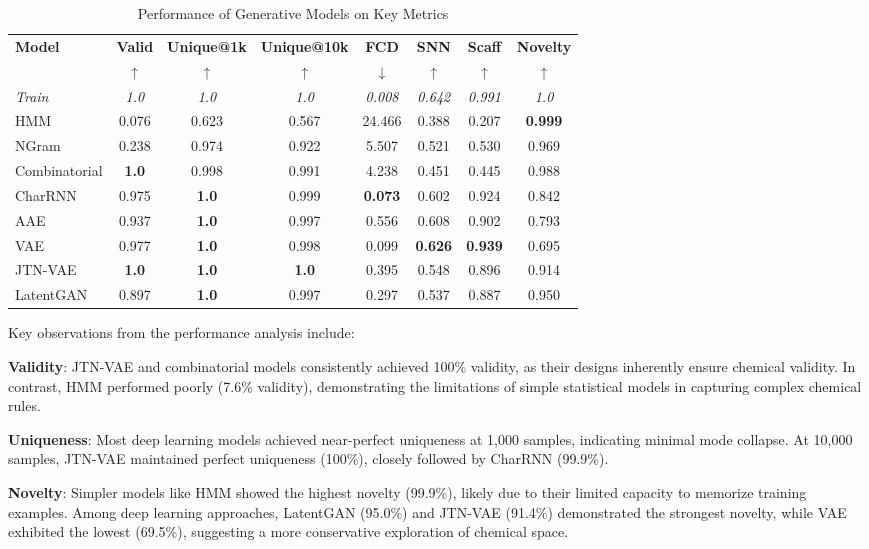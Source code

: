 \documentclass[conference]{IEEEtran}
\begin{document}
\begin{table}[htbp]
\caption{Performance of Generative Models on Key Metrics}
\label{tab:model_performance}
\centering
\small
\begin{tabular}{@{}lccccccc@{}}
\toprule
\textbf{Model} & \textbf{Valid} & \textbf{Unique@1k} & \textbf{Unique@10k} & \textbf{FCD} & \textbf{SNN} & \textbf{Scaff} & \textbf{Novelty} \\
 & ↑ & ↑ & ↑ & ↓ & ↑ & ↑ & ↑ \\
\midrule
\textit{Train} & \textit{1.0} & \textit{1.0} & \textit{1.0} & \textit{0.008} & \textit{0.642} & \textit{0.991} & \textit{1.0} \\
HMM & 0.076 & 0.623 & 0.567 & 24.466 & 0.388 & 0.207 & \textbf{0.999} \\
NGram & 0.238 & 0.974 & 0.922 & 5.507 & 0.521 & 0.530 & 0.969 \\
Combinatorial & \textbf{1.0} & 0.998 & 0.991 & 4.238 & 0.451 & 0.445 & 0.988 \\
CharRNN & 0.975 & \textbf{1.0} & 0.999 & \textbf{0.073} & 0.602 & 0.924 & 0.842 \\
AAE & 0.937 & \textbf{1.0} & 0.997 & 0.556 & 0.608 & 0.902 & 0.793 \\
VAE & 0.977 & \textbf{1.0} & 0.998 & 0.099 & \textbf{0.626} & \textbf{0.939} & 0.695 \\
JTN-VAE & \textbf{1.0} & \textbf{1.0} & \textbf{1.0} & 0.395 & 0.548 & 0.896 & 0.914 \\
LatentGAN & 0.897 & \textbf{1.0} & 0.997 & 0.297 & 0.537 & 0.887 & 0.950 \\
\bottomrule
\end{tabular}
\end{table}

Key observations from the performance analysis include:

\textbf{Validity}: JTN-VAE and combinatorial models consistently achieved 100\% validity, as their designs inherently ensure chemical validity. In contrast, HMM performed poorly (7.6\% validity), demonstrating the limitations of simple statistical models in capturing complex chemical rules.

\textbf{Uniqueness}: Most deep learning models achieved near-perfect uniqueness at 1,000 samples, indicating minimal mode collapse. At 10,000 samples, JTN-VAE maintained perfect uniqueness (100\%), closely followed by CharRNN (99.9\%).

\textbf{Novelty}: Simpler models like HMM showed the highest novelty (99.9\%), likely due to their limited capacity to memorize training examples. Among deep learning approaches, LatentGAN (95.0\%) and JTN-VAE (91.4\%) demonstrated the strongest novelty, while VAE exhibited the lowest (69.5\%), suggesting a more conservative exploration of chemical space.
\end{document}

